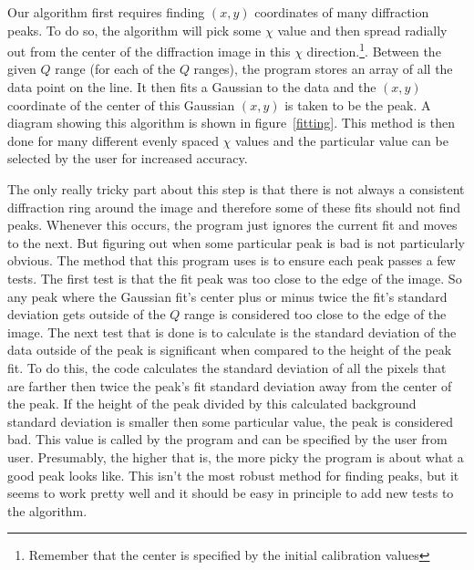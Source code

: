 Our algorithm first requires
finding $(x,y)$ coordinates 
of many diffraction peaks. To do so, the algorithm will 
pick some $\chi$ value and then 
spread radially out from the center of the diffraction
image in this $\chi$ direction.\footnote{Remember
that the center is specified by the initial calibration 
values}. Between the given $Q$ range (for each of the $Q$ 
ranges), the program stores an array of all the data point 
on the line. It then fits a Gaussian to the data and the
$(x,y)$ coordinate of the center of this Gaussian $(x,y)$ 
is taken to be the peak. A diagram showing this algorithm
is shown in figure~\ref{fitting}. This method is
then done for many different evenly spaced $\chi$ values
and the particular value can be selected by the user
for increased accuracy.

The only really tricky part about this step is that
there is not always a consistent diffraction ring 
around the image and therefore some of these fits 
should not find peaks. Whenever this occurs, the program
just ignores the current fit and moves to the next. 
But figuring out when some particular peak is bad
is not particularly obvious. The method that this
program uses is to ensure each peak passes a few
tests. The first test is that the fit peak was
too close to the edge of the image. So any peak where
the Gaussian fit's center plus or minus twice the fit's
standard deviation gets outside of the $Q$ range is
considered too close to the edge of the image.
The next test that is done is to calculate is the
standard deviation of the data outside of the peak is
significant when compared to the height of the peak
fit. To do this, the code calculates the standard 
deviation of all the pixels that are farther then twice
the peak's fit standard deviation away from the
center of the peak. If the height of the peak
divided by this calculated background standard deviation
is smaller then some particular value, the peak is
considered bad. This value is called by the program
 and can be specified by the user from user.
Presumably, the higher that  is, the
more picky the program is about what a good peak looks
like. This isn't the most robust method for finding peaks,
but it seems to work pretty well and it should be easy 
in principle to add new tests to the algorithm.

